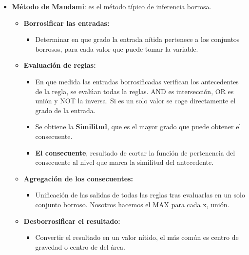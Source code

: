 \documentclass[12pt, twoside, openright]{report} %
\begin{document}
\begin{itemize}
    \begin{itemize}
    \item \textbf{Método de Mandami}: es el método típico de inferencia
      borrosa.
      

      \begin{itemize}
      \item \textbf{Borrosificar las entradas:}
        

        \begin{itemize}
        \item Determinar en que grado la entrada nítida pertenece a los
          conjuntos borrosos, para cada valor que puede tomar la
          variable.
          
        \end{itemize}
      \item \textbf{Evaluación de reglas:}
        

        \begin{itemize}
        \item En que medida las entradas borrosificadas verifican los
          antecedentes de la regla, se evalúan todas la reglas. AND es
          intersección, OR es unión y NOT la inversa. Si es un solo
          valor se coge directamente el grado de la entrada.
          
        \item Se obtiene la \textbf{Similitud}, que es el mayor grado que
          puede obtener el consecuente.
          
        \item \textbf{El consecuente}, resultado de cortar la función de
          pertenencia del consecuente al nivel que marca la similitud
          del antecedente.
          
        \end{itemize}
      \item \textbf{Agregación de los consecuentes:}
        

        \begin{itemize}
        \item Unificación de las salidas de todas las reglas tras evaluarlas
          en un solo conjunto borroso. Nosotros hacemos el MAX para cada
          x, unión.
          
        \end{itemize}
      \item \textbf{Desborrosificar el resultado:}
        

        \begin{itemize}
        \item Convertir el resultado en un valor nítido, el más común es
          centro de gravedad o centro de del área.
          
        \end{itemize}
      \end{itemize}
    \end{itemize}
  \end{itemize}
\end{document}
